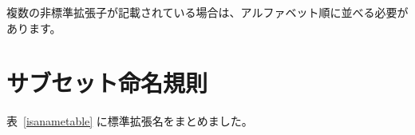 \begin{comment}
If multiple non-standard extensions are listed, they should be ordered
alphabetically.
\end{comment}
複数の非標準拡張子が記載されている場合は、アルファベット順に並べる必要があります。

\begin{comment}
\section{Subset Naming Convention}
\end{comment}
\section{サブセット命名規則}

\begin{comment}
Table~\ref{isanametable} summarizes the standardized extension names.
\end{comment}
表~\ref{isanametable} に標準拡張名をまとめました。
~\\
